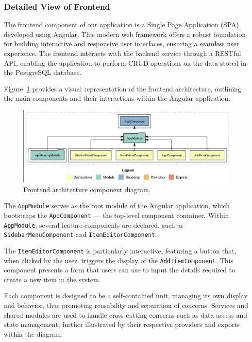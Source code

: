 \newpage

\subsubsection{Detailed View of Frontend}
The frontend component of our application is a Single Page Application (SPA) developed using Angular.
This modern web framework offers a robust foundation for building interactive and responsive user interfaces, ensuring a seamless user experience.
The frontend interacts with the backend service through a RESTful API, enabling the application to perform CRUD operations on the data stored in the PostgreSQL database.

Figure~\ref{fig:frontend_architecture} provides a visual representation of the frontend architecture, outlining the main components and their interactions within the Angular application.

\begin{figure}[H]
    \centering
    \includegraphics[width=\textwidth]{images/frontend/frontend_overview_component}
    \caption{Frontend architecture component diagram.}
    \label{fig:frontend_architecture}
\end{figure}

The \texttt{AppModule} serves as the root module of the Angular application, which bootstraps the \texttt{AppComponent} — the top-level component container.
Within \texttt{AppModule}, several feature components are declared, such as \\\texttt{SidebarMenuComponent} and \texttt{ItemEditorComponent}.

The \texttt{ItemEditorComponent} is particularly interactive, featuring a button that, when clicked by the user, triggers the display of the \texttt{AddItemComponent}.
This component presents a form that users can use to input the details required to create a new item in the system.

Each component is designed to be a self-contained unit, managing its own display and behavior, thus promoting reusability and separation of concerns.
Services and shared modules are used to handle cross-cutting concerns such as data access and state management, further illustrated by their respective providers and exports within the diagram.

